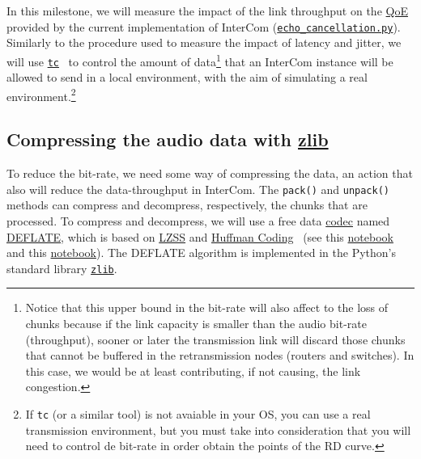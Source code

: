 In this milestone, we will measure the impact of the link throughput
on the \href{https://en.wikipedia.org/wiki/Quality_of_experience}{QoE}
provided by the current implementation of InterCom
(\href{https://github.com/Tecnologias-multimedia/InterCom/blob/master/src/echo_cancellation.py}{\texttt{echo\_cancellation.py}}). Similarly
to the procedure used to measure the impact of latency and jitter, we
will use
\href{https://man7.org/linux/man-pages/man8/tc.8.html}{\texttt{tc}}~\cite{bert2012lartc}
to control the amount of data\footnote{Notice that this upper bound in
  the bit-rate will also affect to the loss of chunks because if the
  link capacity is smaller than the audio bit-rate (throughput),
  sooner or later the transmission link will discard those chunks that
  cannot be buffered in the retransmission nodes (routers and
  switches). In this case, we would be at least contributing, if not
  causing, the link congestion.} that an InterCom instance will be
allowed to send in a local environment, with the aim of simulating a
real environment.\footnote{If \texttt{tc} (or a similar tool) is not
  avaiable in your OS, you can use a real transmission environment,
  but you must take into consideration that you will need to control
  de bit-rate in order obtain the points of the RD curve.}

\subsection{Compressing the audio data with \href{https://zlib.net/}{zlib}}
To reduce the bit-rate, we need some way of compressing the data, an
action that also will reduce the data-throughput in InterCom. The
\verb|pack()| and \verb|unpack()| methods can compress and
decompress, respectively, the chunks that are processed. To compress
and decompress, we will use a free data
\href{https://en.wikipedia.org/wiki/Codec}{codec} named
\href{https://en.wikipedia.org/wiki/DEFLATE}{DEFLATE}, which is based
on
\href{https://en.wikipedia.org/wiki/Lempel%E2%80%93Ziv%E2%80%93Storer%E2%80%93Szymanski}{LZSS}
  and \href{https://en.wikipedia.org/wiki/Huffman_coding}{Huffman
    Coding}~\cite{nelson96datacompression} (see this
  \href{https://github.com/vicente-gonzalez-ruiz/LZ77/blob/master/index.ipynb}{notebook} and
  this
  \href{https://github.com/vicente-gonzalez-ruiz/Huffman_coding/blob/master/index.ipynb}{notebook}). The
  DEFLATE algorithm is implemented in the Python's standard library
  \href{https://docs.python.org/3/library/zlib.html}{\texttt{zlib}}. %


